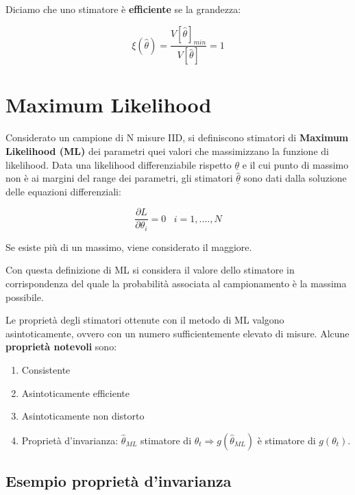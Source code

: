 \documentclass[11pt,a4paper]{book}
\begin{document}
\noindent Diciamo che uno stimatore \`{e} \textbf{efficiente} se la grandezza:

\begin{equation}
	\xi(\hat{\theta}) = \frac{V[\hat{\theta}]_{min}}{V[\hat{\theta}]} = 1
\end{equation}
	
\section{Maximum Likelihood}

Considerato un campione di N misure IID, si definiscono stimatori di \textbf{Maximum Likelihood (ML)} dei parametri quei valori che massimizzano la funzione di likelihood. Data una likelihood differenziabile rispetto $\underline{\theta}$ e il cui punto di massimo non \`{e} ai margini del range dei parametri, gli stimatori $\underline{\hat{\theta}}$ sono dati dalla soluzione delle equazioni differenziali:

\begin{equation}
\frac{\partial L}{\partial \theta_{i}}=0 \;\;\; i = 1,....,N
\end{equation}

\noindent Se esiste pi\`{u} di un massimo, viene considerato il maggiore. \newline

\noindent Con questa definizione di ML si considera il valore dello stimatore in corrispondenza del quale la probabilit\`{a} associata al campionamento \`{e} la massima possibile.

\noindent Le propriet\`{a} degli stimatori ottenute con il metodo di ML valgono asintoticamente, ovvero con un numero sufficientemente elevato di misure. Alcune \textbf{propriet\`{a} notevoli} sono:

\begin{enumerate}
	\item Consistente
	\item Asintoticamente efficiente
	\item Asintoticamente non distorto
	\item Propriet\`{a} d'invarianza: $\hat{\theta}_{ML}$ stimatore di $\theta_{t} \Rightarrow g(\hat{\theta}_{ML})$ \`{e} stimatore di $g(\theta_{t})$.
\end{enumerate}

\subsection*{Esempio propriet\`{a} d'invarianza}
\end{document}
